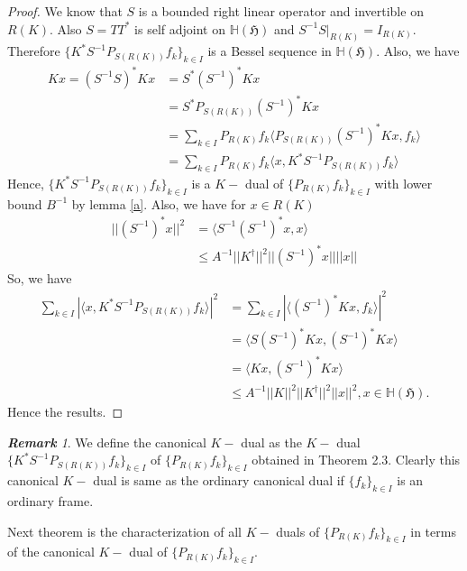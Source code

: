 \documentclass[a4paper,12pt,reqno]{amsart}
\theoremstyle{plain}
\theoremstyle{remark}
\newtheorem{remark}[theorem]{\bf Remark}
\begin{document}
	\begin{proof}
		We know that $S$ is a bounded right linear operator and invertible on $R(K)$. 
		Also $S=TT^*$ is self adjoint on $\mathbb{H}(\mathfrak{H})$ and $S^{-1}S |_{R(K)}=I_{R(K)}$. Therefore $\{K^* S^{-1}P_{S(R(K))}f_k\}_{k\in I}$ is a Bessel sequence in $\mathbb{H}(\mathfrak{H})$. Also, we have 
		\begin{align*}
			Kx=(S^{-1}S)^*Kx&=S^*(S^{-1})^*Kx\\
			&=S^*P_{S(R(K))}(S^{-1})^*Kx\\
			&=\sum_{k\in I } P_{R(K)}f_k\langle  P_{S(R(K))}(S^{-1})^*Kx , f_k\rangle \\
			&=\sum_{k\in I }P_{R(K)}f_k\langle  x , K^* S^{-1}P_{S(R(K))}f_k\rangle 
		\end{align*}
		Hence, $\{K^* S^{-1}P_{S(R(K))}f_k\}_{k\in I}$ is a $K-$ dual of $\{P_{R(K)}f_k\}_{k\in I}$ with lower bound $B^{-1}$ by lemma \ref{a}. Also, we have for $x\in R(K)$
		\begin{align*}
			||(S^{-1})^*x||^2&=\langle S^{-1}(S^{-1})^*x,x\rangle\\
			&\le A^{-1}||K^{\dagger}||^2||(S^{-1})^*x|| ||x||
		\end{align*}
		So, we have 
		\begin{align*}
			\sum_{k\in I}|\langle x,  K^* S^{-1}P_{S(R(K))}f_k\rangle|^2 &=\sum_{k\in I}|\langle (S^{-1})^*Kx, f_k\rangle|^2\\ &=\langle S(S^{-1})^*Kx, (S^{-1})^*Kx \rangle \\ &= \langle Kx, (S^{-1})^*Kx \rangle \\
			&\le A^{-1}||K||^2||K^{\dagger}||^2||x||^2, x\in \mathbb{H}(\mathfrak{H}).
		\end{align*}
		Hence the results.
	\end{proof}
	
	\begin{remark}
		We define the canonical $K-$ dual as the $K-$ dual $\{K^* S^{-1}P_{S(R(K))}f_k\}_{k\in I}$ of $\{P_{R(K)}f_k\}_{k\in I}$ obtained in Theorem 2.3. Clearly this canonical $K-$ dual is same as the ordinary canonical dual if $\{f_k\}_{k\in I}$ is an ordinary frame.
	\end{remark}
	
	
	
	
	Next theorem is the characterization of all $K-$ duals of $\{P_{R(K)}f_k\}_{k\in I}$ in terms of the canonical $K-$ dual of  $\{P_{R(K)}f_k\}_{k\in I}$.
	
\end{document}
